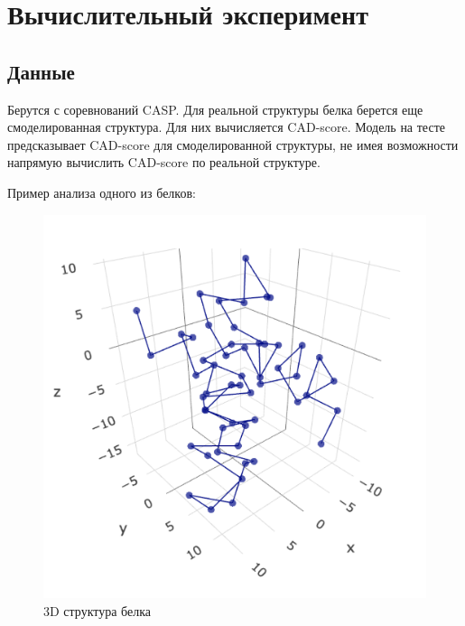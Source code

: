 \documentclass[12pt,twosides]{article}
\begin{document}
		
	\section{Вычислительный эксперимент}
		
			\subsection{Данные}
			Берутся с соревнований CASP. Для реальной структуры белка берется еще смоделированная структура. Для них вычисляется CAD-score. Модель на тесте предсказывает CAD-score для смоделированной структуры, не имея возможности напрямую вычислить CAD-score по реальной структуре.
			
			Пример анализа одного из белков:
			\begin{figure}[!h]
				\centering
				\begin{minipage}[b]{0.45\textwidth}
					\includegraphics[width=\textwidth]{fig1.pdf}
					\caption{3D структура белка}
				\end{minipage}
				\hfill
				\begin{minipage}[b]{0.45\textwidth}

\end{minipage}
\end{figure}
\end{document}
